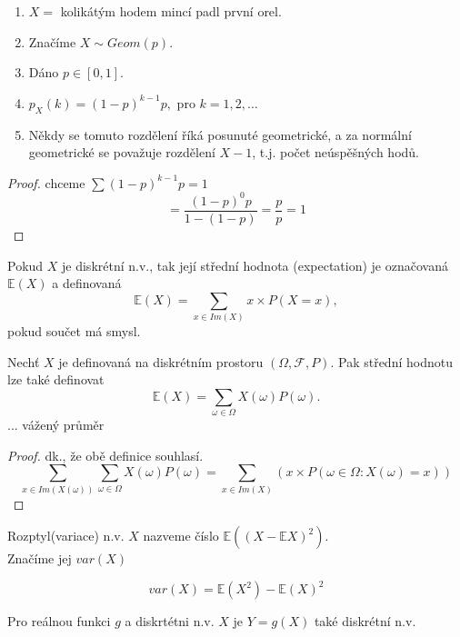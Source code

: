 \documentclass[../main.tex]{subfiles}
\begin{document}
\begin{definition}

    \begin{enumerate}
        \item $X =$ kolikátým hodem mincí padl první orel.
        \item Značíme $X \sim Geom(p)$.
        \item Dáno $p\in [0,1]$.
        \item $p_X(k) = (1-p)^{k-1}p,$ pro $k=1,2,\dots$
        \item Někdy se tomuto rozdělení říká posunuté geometrické, a za normální geometrické
        se považuje rozdělení $X-1$, t.j. počet neúspěšných hodů.
    \end{enumerate}
    \begin{proof}
        chceme $\sum (1-p)^{k-1}p = 1$
        \[= \frac{(1-p)^{0}p}{1- (1-p)} = \frac{p}{p} = 1\]
    \end{proof}
\end{definition}
\begin{definition}
    
    Pokud $X$ je diskrétní n.v., tak její střední hodnota (expectation) je označovaná $\mathbb{E}(X)$ a definovaná
    \[\mathbb{E}(X) = \sum_{x\in Im(X)}x \times P(X=x),\]
    pokud součet má smysl.
    
    Nechť $X$ je definovaná na diskrétním prostoru $(\Omega, \mathcal{F},P)$. Pak střední hodnotu lze také definovat
    \[\mathbb{E}(X) = \sum_{\omega \in \Omega} X(\omega)P({\omega}).\]
    ... vážený průměr 
    \begin{proof}
        dk., že obě definice souhlasí.
        \[\sum_{x\in Im(X(\omega))} \sum_{\omega \in \Omega} X(\omega) P({\omega}) = \sum_{x\in Im(X)}(x\times P({\omega \in \Omega : X(\omega) = x}))\]
    \end{proof}
\end{definition}
\begin{definition}[Rozptyl]

    Rozptyl(variace) n.v. $X$ nazveme číslo $\mathbb{E}((X-\mathbb{E}X)^2)$.\\
    Značíme jej $var(X)$

    \begin{theorem}
    \[var(X) = \mathbb{E}(X^2) - \mathbb{E}(X)^2\]
    \end{theorem}
\end{definition}
\begin{definition}

    Pro reálnou funkci $g$ a diskrtétni n.v. $X$ je $Y = g(X)$ také diskrétní n.v.
\end{definition}
\end{document}
